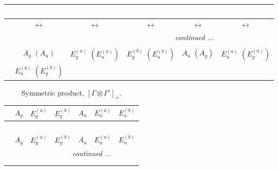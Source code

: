 \documentclass[fleqn,10pt,landscape]{article}
\begin{document}
\begin{itemize}
\begin{center}
\begin{longtable}{cccccc}
\multicolumn{5}{l}{\tablename\ \thetable{}} \\
 \hline \hline
 & $\leftrightarrow$ & $\leftrightarrow$ & $\leftrightarrow$ & $\leftrightarrow$ & $\leftrightarrow$ \\ \hline \endhead

 \hline \hline
\multicolumn{5}{r}{\footnotesize\it continued ...} \\ \endfoot

 \hline \hline
\multicolumn{5}{r}{} \\ \endlastfoot

 & $ A_{g}\,\,(A_{u}) $ & $ E_{g}^{(a)}\,\,(E_{u}^{(a)}) $ & $ E_{g}^{(b)}\,\,(E_{u}^{(b)}) $ & $ A_{u}\,\,(A_{g}) $ & $ E_{u}^{(a)}\,\,(E_{g}^{(a)}) $ \\
& $ E_{u}^{(b)}\,\,(E_{g}^{(b)}) $ & $  $ & $  $ & $  $ & $  $ \\
\end{longtable}
\end{center}
\begin{center}
\renewcommand{\arraystretch}{1.0}
\begin{longtable}{c|cccccc}
\caption{Symmetric product, $[\Gamma\otimes\Gamma']_+.$}
 \\
 \hline \hline
 & $ A_{g} $ & $ E_{g}^{(a)} $ & $ E_{g}^{(b)} $ & $ A_{u} $ & $ E_{u}^{(a)} $ & $ E_{u}^{(b)} $ \\ \hline \endfirsthead

\multicolumn{6}{l}{\tablename\ \thetable{}} \\
 \hline \hline
 & $ A_{g} $ & $ E_{g}^{(a)} $ & $ E_{g}^{(b)} $ & $ A_{u} $ & $ E_{u}^{(a)} $ & $ E_{u}^{(b)} $ \\ \hline \endhead

 \hline \hline
\multicolumn{6}{r}{\footnotesize\it continued ...} \\ \endfoot

 \hline \hline
\multicolumn{6}{r}{} \\ \endlastfoot


\end{longtable}
\end{center}
\end{itemize}
\end{document}
